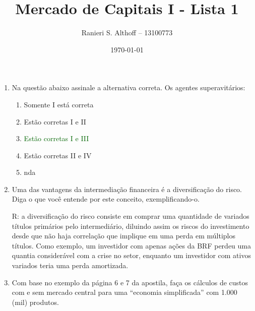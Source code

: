 \documentclass{article}
\begin{document}
\title{Mercado de Capitais I - Lista 1}
\author{Ranieri S. Althoff -- 13100773}
\date{\today}

\maketitle

\begin{enumerate}
    \item Na questão abaixo assinale a alternativa correta.
        Os agentes superavitários:


        \begin{enumerate}[label={(\alph*)},leftmargin=1cm]
            \item Somente I está correta
            \item Estão corretas I e II
            \item \textcolor{DarkGreen}{Estão corretas I e III}
            \item Estão corretas II e IV
            \item nda
        \end{enumerate}

    \item Uma das vantagens da intermediação financeira é a diversificação do
        risco. Diga o que você entende por este conceito, exemplificando-o.

        R: a diversificação do risco consiste em comprar uma quantidade de
        variados títulos primários pelo intermediário, diluindo assim os riscos
        do investimento desde que não haja correlação que implique em uma perda
        em múltiplos títulos. Como exemplo, um investidor com apenas ações da
        BRF perdeu uma quantia considerável com a crise no setor, enquanto um
        investidor com ativos variados teria uma perda amortizada.

    \item Com base no exemplo da página 6 e 7 da apostila, faça os cálculos de
        custos com e sem mercado central para uma “economia simplificada” com
        1.000 (mil) produtos.


\end{enumerate}
\end{document}
